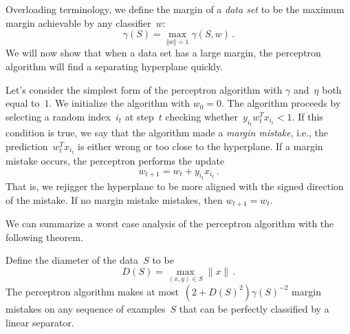 \documentclass{tufte-book}
\begin{document}
Overloading terminology, we define the margin of a \emph{data set} to be
the maximum margin achievable by any classifier~\(w\): \[
  \gamma(S) = \max_{\Vert w \Vert =1} \gamma(S,w)\,.
\] We will now show that when a data set has a large margin, the
perceptron algorithm will find a separating hyperplane quickly.

Let's consider the simplest form of the perceptron algorithm with
\(\gamma\) and~\(\eta\) both equal to~\(1\). We initialize the algorithm
with \(w_0=0\). The algorithm proceeds by selecting a random
index~\(i_t\) at step~\(t\) checking
whether~\(y_{i_t} w_t^Tx_{i_t} < 1\). If this condition is true, we say
that the algorithm made a \emph{margin mistake}, i.e., the
prediction~\(w_t^T x_{i_t}\) is either wrong or too close to the
hyperplane. If a margin mistake occurs, the perceptron performs the
update \[
    w_{t+1} = w_t + y_{i_t} x_{i_t}\,.
\] That is, we rejigger the hyperplane to be more aligned with the
signed direction of the mistake. If no margin mistake mistakes, then
\(w_{t+1}=w_t\).

We can summarize a worst case analysis of the perceptron algorithm with
the following theorem.

\begin{Theorem}

Define the diameter of the data~\(S\) to be \[
D(S) = \max_{(x,y)\in S}\|x\|\,.
\] The perceptron algorithm makes at most~\((2+D(S)^2)\gamma(S)^{-2}\)
margin mistakes on any sequence of examples~\(S\) that can be perfectly
classified by a linear separator.

\end{Theorem}
\end{document}
